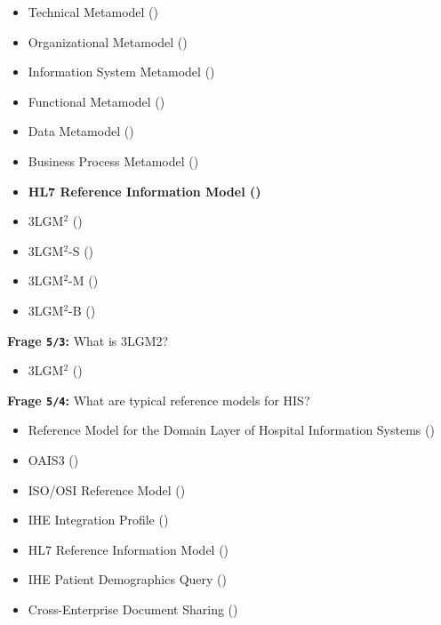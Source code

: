 \begin{itemize}
  \item Technical Metamodel ()
  \item Organizational Metamodel ()
  \item Information System Metamodel ()
  \item Functional Metamodel ()
  \item Data Metamodel ()
  \item Business Process Metamodel ()
  \item \textbf{ HL7 Reference Information Model ()}
  \item 3LGM$^{2}$ ()
  \item 3LGM$^{2}$-S ()
  \item 3LGM$^{2}$-M ()
  \item 3LGM$^{2}$-B ()
\end{itemize}

\textbf{Frage \texttt{5/3}:} What is 3LGM2?

\begin{itemize}
  \item 3LGM$^{2}$ ()
\end{itemize}

\textbf{Frage \texttt{5/4}:} What are typical reference models for HIS?

\begin{itemize}
  \item Reference Model for the Domain Layer of Hospital Information Systems ()
  \item OAIS3 ()
  \item ISO/OSI Reference Model ()
  \item IHE Integration Profile ()
  \item HL7 Reference Information Model ()
  \item IHE Patient Demographics Query ()
  \item Cross-Enterprise Document Sharing ()
\end{itemize}

